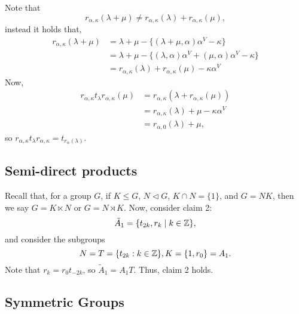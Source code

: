 Note that
\[
    r_{\alpha,\kappa}(\lambda + \mu) \neq r_{\alpha,\kappa}(\lambda)
    + r_{\alpha,\kappa}(\mu),
\]
instead it holds that,
\begin{align*}
    r_{\alpha, \kappa} (\lambda+\mu)
    &= \lambda + \mu - \{(\lambda + \mu, \alpha) \alpha^V - \kappa\} \\
    &= \lambda + \mu - \{(\lambda, \alpha) \alpha^V + (\mu, \alpha) \alpha^V - \kappa\} \\
    &= r_{\alpha,\kappa}(\lambda) + r_{\alpha, \kappa}(\mu) - \kappa \alpha^V
\end{align*}
Now,
\begin{align*}
    r_{\alpha,\kappa} t_{\lambda} r_{\alpha, \kappa}(\mu)
    &= r_{\alpha, \kappa}(\lambda + r_{\alpha, \kappa}(\mu)) \\
    &= r_{\alpha, \kappa}(\lambda) + \mu - \kappa \alpha^V \\
    &= r_{\alpha,0}(\lambda) + \mu,
\end{align*}
so $r_{\alpha, \kappa} t_\lambda r_{\alpha, \kappa} = t_{r_\alpha(\lambda)}$.

\subsection{Semi-direct products}

Recall that, for a group $G$, if $K \leq G$, $N \triangleleft G$,
$K \cap N = \{1\}$, and $G = NK$,
then we say $G = K \ltimes N$ or $G = N \rtimes K$.
Now, consider claim 2:
\[
    \tilde{A}_1 = \{t_{2k}, r_k \mid k \in \mathbb{Z}\},
\]
and consider the subgroups
\[
    N = T = \{t_{2k} : k \in \mathbb{Z}\}, K = \{1, r_0\} = A_1.
\]
Note that $r_k = r_0 t_{-2k}$, so $\tilde{A}_1 = A_1T$. Thus, claim 2 holds.

\subsection{Symmetric Groups}

